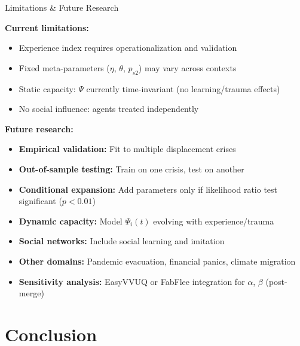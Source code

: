\documentclass[aspectratio=169]{beamer}
\begin{document}
\begin{frame}{Limitations \& Future Research}

\textbf{Current limitations:}
\begin{itemize}
    \item Experience index requires operationalization and validation
    \item Fixed meta-parameters ($\eta$, $\theta$, $p_{s2}$) may vary across contexts
    \item Static capacity: $\Psi$ currently time-invariant (no learning/trauma effects)
    \item No social influence: agents treated independently
\end{itemize}

\vspace{0.5em}

\textbf{Future research:}
\begin{itemize}
    \item \textbf{Empirical validation:} Fit to multiple displacement crises
    \item \textbf{Out-of-sample testing:} Train on one crisis, test on another
    \item \textbf{Conditional expansion:} Add parameters only if likelihood ratio test significant ($p < 0.01$)
    \item \textbf{Dynamic capacity:} Model $\Psi_i(t)$ evolving with experience/trauma
    \item \textbf{Social networks:} Include social learning and imitation
    \item \textbf{Other domains:} Pandemic evacuation, financial panics, climate migration
    \item \textbf{Sensitivity analysis:} EasyVVUQ or FabFlee integration for $\alpha$, $\beta$ (post-merge)
\end{itemize}

\end{frame}

\section{Conclusion}
\end{document}
